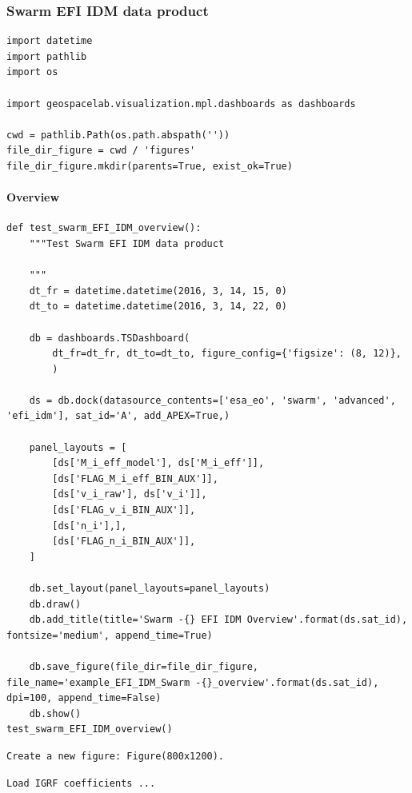 \subsubsection{Swarm EFI IDM data product}

\begin{verbatim}
import datetime
import pathlib
import os

import geospacelab.visualization.mpl.dashboards as dashboards

cwd = pathlib.Path(os.path.abspath(''))
file_dir_figure = cwd / 'figures'
file_dir_figure.mkdir(parents=True, exist_ok=True)
\end{verbatim}

\paragraph{Overview}

\begin{verbatim}
def test_swarm_EFI_IDM_overview():
    """Test Swarm EFI IDM data product
    
    """
    dt_fr = datetime.datetime(2016, 3, 14, 15, 0)
    dt_to = datetime.datetime(2016, 3, 14, 22, 0)

    db = dashboards.TSDashboard(
        dt_fr=dt_fr, dt_to=dt_to, figure_config={'figsize': (8, 12)},
        )

    ds = db.dock(datasource_contents=['esa_eo', 'swarm', 'advanced', 'efi_idm'], sat_id='A', add_APEX=True,)

    panel_layouts = [
        [ds['M_i_eff_model'], ds['M_i_eff']],
        [ds['FLAG_M_i_eff_BIN_AUX']],
        [ds['v_i_raw'], ds['v_i']],
        [ds['FLAG_v_i_BIN_AUX']],
        [ds['n_i'],],
        [ds['FLAG_n_i_BIN_AUX']],
    ]

    db.set_layout(panel_layouts=panel_layouts)
    db.draw()
    db.add_title(title='Swarm -{} EFI IDM Overview'.format(ds.sat_id), fontsize='medium', append_time=True)

    db.save_figure(file_dir=file_dir_figure, file_name='example_EFI_IDM_Swarm -{}_overview'.format(ds.sat_id), dpi=100, append_time=False)
    db.show()
test_swarm_EFI_IDM_overview()
\end{verbatim}

\begin{verbatim}
Create a new figure: Figure(800x1200).
\end{verbatim}

\begin{verbatim}
Load IGRF coefficients ...
\end{verbatim}


